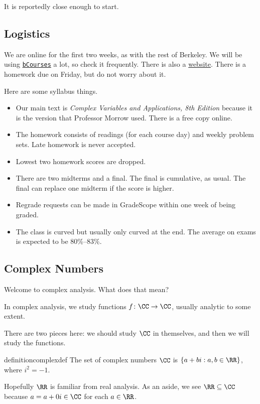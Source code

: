 
It is reportedly close enough to start.

\subsection{Logistics}
We are online for the first two weeks, as with the rest of Berkeley. We will be using \href{https://bcourses.berkeley.edu/courses/1511845}{\texttt{bCourses}} a lot, so check it frequently. There is also a \href{https://sites.google.com/view/ucb-math185-005-spring2022/home}{website}. There is a homework due on Friday, but do not worry about it.

Here are some syllabus things.
\begin{itemize}
	\item Our main text is \textit{Complex Variables and Applications, 8th Edition} because it is the version that Professor Morrow used. There is a free copy online.
	\item The homework consists of readings (for each course day) and weekly problem sets. Late homework is never accepted.
	\item Lowest two homework scores are dropped.
	\item There are two midterms and a final. The final is cumulative, as usual. The final can replace one midterm if the score is higher.
	\item Regrade requests can be made in GradeScope within one week of being graded.
	\item The class is curved but usually only curved at the end. The average on exams is expected to be 80\%--83\%.
\end{itemize}

\subsection{Complex Numbers}
Welcome to complex analysis. What does that mean?
\begin{idea}
	In complex analysis, we study functions $f\colon\CC\to\CC$, usually analytic to some extent.
\end{idea}
There are two pieces here: we should study $\CC$ in themselves, and then we will study the functions.
\begin{restatable}{definition}{complexdef}
	The set of complex numbers $\CC$ is $\{a+bi:a,b\in\RR\}$, where $i^2=-1$.
\end{restatable}
\noindent Hopefully $\RR$ is familiar from real analysis. As an aside, we see $\RR\subseteq\CC$ because $a=a+0i\in\CC$ for each $a\in\RR$.

